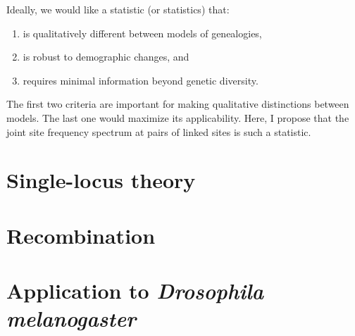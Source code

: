 \documentclass[11pt, letterpaper]{article}   	%
\begin{document}
Ideally, we would like a statistic (or statistics) that:
\begin{enumerate}
\item is qualitatively different between models of genealogies,
\item is robust to demographic changes, and
\item requires minimal information beyond genetic diversity.
\end{enumerate}
The first two criteria are important for making qualitative distinctions between models. The last one would maximize its applicability.
Here, I propose that the joint site frequency spectrum at pairs of linked sites is such a statistic.

\section*{Single-locus theory}

\section*{Recombination}

\section*{Application to \textit{Drosophila melanogaster}}

\printbibliography
\end{document}
